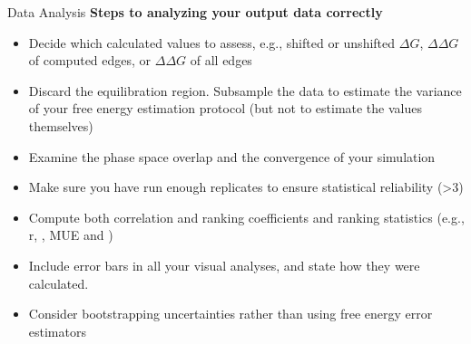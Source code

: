 \documentclass[9pt,bestpractices]{livecoms}
\begin{document}
\begin{Checklists*}
\begin{checklist}{Data Analysis}
    \textbf{Steps to analyzing your output data correctly}
\begin{itemize}
    \item Decide which calculated values to assess, e.g., shifted or unshifted $\Delta G$,  $\Delta \Delta G$ of computed edges, or $\Delta \Delta G$ of all edges
    \item Discard the equilibration region. Subsample the data to estimate the variance of your free energy estimation protocol (but not to estimate the values themselves)
    \item Examine the phase space overlap and the convergence of your simulation
    \item Make sure you have run enough replicates to ensure statistical reliability (\textgreater3)
    \item Compute both correlation and ranking coefficients and ranking statistics (e.g., r, \textrho, MUE and \texttau)
    \item Include error bars in all your visual analyses, and state how they were calculated.
    \item Consider bootstrapping uncertainties rather than using free energy error estimators
\end{itemize}
\end{checklist}
\end{Checklists*}
\clearpage
\end{document}
